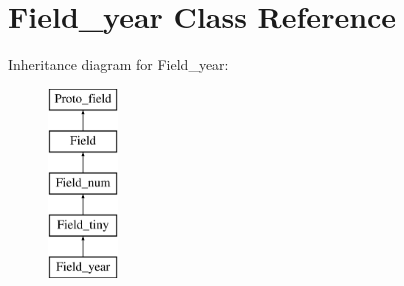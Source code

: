 \hypertarget{classField__year}{}\section{Field\+\_\+year Class Reference}
\label{classField__year}
Inheritance diagram for Field\+\_\+year\+:\begin{figure}[H]
\begin{center}
\leavevmode
\includegraphics[height=5.000000cm]{classField__year}
\end{center}
\end{figure}
